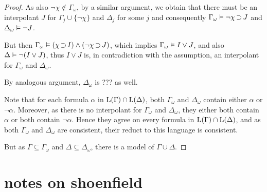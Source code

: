 \begin{proof}
As also $\lnot\chi \not\in \Gamma_\omega$, by a similar argument, we obtain that 
there must be an interpolant $J$ for $\Gamma_j \cup \{\lnot \chi\}$ and $\Delta_j$ for some $j$ and consequently
$\Gamma_\omega \vDash \lnot \chi \operatorname{\supset} J$ 
and $\Delta_\omega \vDash \lnot J$.

But then
$\Gamma_\omega \vDash (\chi \operatorname{\supset} I) \land (\lnot \chi \operatorname{\supset} J)$, which implies $\Gamma_\omega \vDash I\lor J$, and also $\Delta\vDash \lnot (I \lor J)$, thus $I\lor J$ is, in contradiction with the assumption, an interpolant for $\Gamma_\omega$ and $\Delta_\omega$.

By analogous argument, $\Delta_\omega$ is ??? as well. 

Note that for each formula $\alpha$ in $\operatorname{L}(\Gamma) \cap \operatorname{L}(\Delta)$,
both $\Gamma_\omega$ and $\Delta_\omega$ contain either $\alpha$ or $\lnot \alpha$.
Moreover, as there is no interpolant for $\Gamma_\omega$ and $\Delta_\omega$, they either both contain $\alpha$ or both contain $\lnot \alpha$.
Hence they agree on every formula in $\operatorname{L}(\Gamma) \cap \operatorname{L}(\Delta)$, and as both $\Gamma_\omega$ and $\Delta_\omega$ are consistent, their reduct to this language is consistent.

But as $\Gamma \subseteq \Gamma_\omega$ and 
$\Delta \subseteq \Delta_\omega$, there is a model of $\Gamma \cup \Delta$.






\end{proof}


\clearpage



\section{notes on shoenfield}

